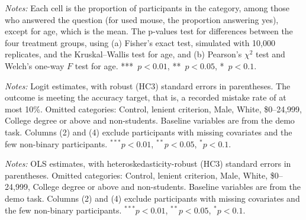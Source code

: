 \documentclass[12pt, letterpaper]{article}
\begin{document}
\begin{table}[p]
\centering
\caption{Covariates by treatment group (macroeconomics class sample)}\label{tab:covariates-sumstats-macro}
\begin{threeparttable}

\begin{tablenotes}[flushleft]
\footnotesize
\item \textit{Notes:} Each cell is the proportion of participants in the category, among those who answered the question (for used mouse, the proportion answering yes), except for age, which is the mean. The p-values test for differences between the four treatment groups, using (a) Fisher's exact test, simulated with 10,000 replicates, and the Kruskal--Wallis test for age, and (b) Pearson's $\chi^2$ test and Welch's one-way $F$ test for age. ***~$p<0.01$, **~$p<0.05$, *~$p<0.1$.
\end{tablenotes}
\end{threeparttable}
\end{table}

\begin{table}[p]
\centering
\caption{Treatment effects on accuracy target achievement likelihood (pooled sample)}\label{tab:reg-target-full}
\begin{threeparttable}
\scriptsize\renewcommand{\arraystretch}{0.85}

\begin{tablenotes}[flushleft]
\scriptsize
\item \textit{Notes:} Logit estimates, with robust (HC3) standard errors in parentheses. The outcome is meeting the accuracy target, that is, a recorded mistake rate of at most 10\%. Omitted categories: Control, lenient criterion, Male, White, \$0--24,999, College degree or above and non-students. Baseline variables are from the demo task. Columns (2) and (4) exclude participants with missing covariates and the few non-binary participants. $^{***}p<0.01$, $^{**}p<0.05$, $^{*}p<0.1$.
\end{tablenotes}
\end{threeparttable}
\end{table}

\begin{table}[p]
\centering
\caption{Treatment effects on mistakes rate (pooled sample)}\label{tab:reg-mistakes-full}
\begin{threeparttable}
\scriptsize\renewcommand{\arraystretch}{0.85}

\begin{tablenotes}[flushleft]
\scriptsize
\item \textit{Notes:} OLS estimates, with heteroskedasticity-robust (HC3) standard errors in parentheses. Omitted categories: Control, lenient criterion, Male, White, \$0--24,999, College degree or above and non-students. Baseline variables are from the demo task. Columns (2) and (4) exclude participants with missing covariates and the few non-binary participants. $^{***}p<0.01$, $^{**}p<0.05$, $^{*}p<0.1$.
\end{tablenotes}
\end{threeparttable}
\end{table}
\end{document}
